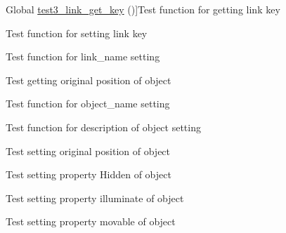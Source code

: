 \begin{DoxyRefList}
\hypertarget{test__test000049}{}%
Global \hyperlink{link__test_8c_ac096b0cd1e6b6b44682dc43191a94296}{test3\+\_\+link\+\_\+get\+\_\+key} ()]Test function for getting link key  
\item[\label{test__test000046}%
\hypertarget{test__test000046}{}%
Global \hyperlink{link__test_8c_ab9c08837de834dc139566cefae8e25c2}{test3\+\_\+link\+\_\+set\+\_\+key} ()]Test function for setting link key  
\item[\label{test__test000026}%
\hypertarget{test__test000026}{}%
Global \hyperlink{link__test_8c_a8396e33f601deb52c940cb89cd7c6bfe}{test3\+\_\+link\+\_\+set\+\_\+name} ()]Test function for link\+\_\+name setting  
\item[\label{test__test000096}%
\hypertarget{test__test000096}{}%
Global \hyperlink{object__test_8c_aaef8c81d135b0e5dcc9972bc04991c69}{test3\+\_\+object\+\_\+get\+\_\+original\+\_\+position} ()]Test getting original position of object  
\item[\label{test__test000058}%
\hypertarget{test__test000058}{}%
Global \hyperlink{object__test_8c_ab40669b5d083b6484197d917fb6882b1}{test3\+\_\+object\+\_\+set\+\_\+name} ()]Test function for object\+\_\+name setting  
\item[\label{test__test000063}%
\hypertarget{test__test000063}{}%
Global \hyperlink{object__test_8c_a61b511105851e73fb0bdaf0b7624370b}{test3\+\_\+object\+\_\+set\+\_\+original\+\_\+description} ()]Test function for description of object setting  
\item[\label{test__test000099}%
\hypertarget{test__test000099}{}%
Global \hyperlink{object__test_8c_a1a521d43a34ab0744c551f547120b24e}{test3\+\_\+object\+\_\+set\+\_\+original\+\_\+position} ()]Test setting original position of object  
\item[\label{test__test000104}%
\hypertarget{test__test000104}{}%
Global \hyperlink{object__test_8c_a83a9139598c0d1683c39a390ce4af8ad}{test3\+\_\+object\+\_\+set\+\_\+prop\+\_\+\+Hidden} ()]Test setting property Hidden of object  
\item[\label{test__test000083}%
\hypertarget{test__test000083}{}%
Global \hyperlink{object__test_8c_aa6e6c87c5a7f2d3552dd33d7a5f160cf}{test3\+\_\+object\+\_\+set\+\_\+prop\+\_\+\+Illuminate} ()]Test setting property illuminate of object  
\item[\label{test__test000073}%
\hypertarget{test__test000073}{}%
Global \hyperlink{object__test_8c_a8764a4a50a115de3c998d6ae53e8020e}{test3\+\_\+object\+\_\+set\+\_\+prop\+\_\+\+Movable} ()]Test setting property movable of object  

\end{DoxyRefList}
